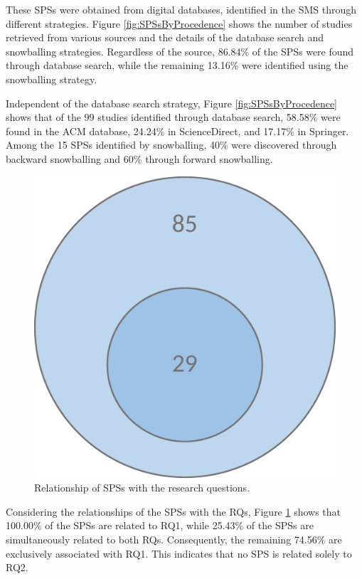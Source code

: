 These SPSs were obtained from digital databases, identified in the SMS through different strategies. Figure \ref{fig:SPSsByProcedence} shows the number of studies retrieved from various sources and the details of the database search and snowballing strategies. Regardless of the source, 86.84\% of the SPSs were found through database search, while the remaining 13.16\% were identified using the snowballing strategy.

Independent of the database search strategy, Figure \ref{fig:SPSsByProcedence} shows that of the 99 studies identified through database search, 58.58\% were found in the ACM database, 24.24\% in ScienceDirect, and 17.17\% in Springer. Among the 15 SPSs identified by snowballing, 40\% were discovered through backward snowballing and 60\% through forward snowballing.

\begin{figure}[ht]
	\centering
	\includegraphics[scale=0.2]{resources/figures/Imagen2.eps}
	\caption{Relationship of SPSs with the research questions.}
	\label{fig:SPSsByRQs}
\end{figure}

Considering the relationships of the SPSs with the RQs, Figure \ref{fig:SPSsByRQs} shows that 100.00\% of the SPSs are related to RQ1, while 25.43\% of the SPSs are simultaneously related to both RQs. Consequently, the remaining 74.56\% are exclusively associated with RQ1. This indicates that no SPS is related solely to RQ2.

